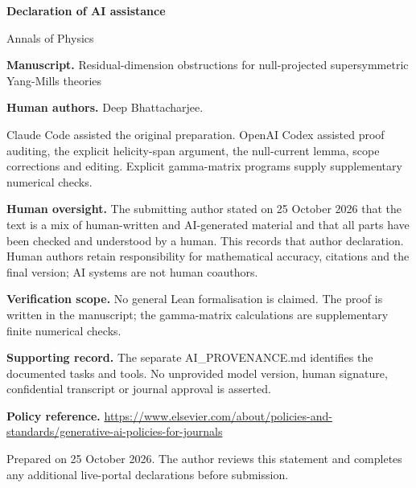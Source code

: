 \documentclass[11pt]{article}
\begin{document}
{\Large\bfseries\color{ink} Declaration of AI assistance}\par
Annals of Physics\par{}\par\medskip
\textbf{Manuscript.} Residual-dimension obstructions for null-projected supersymmetric Yang-Mills theories\par

\textbf{Human authors.} Deep Bhattacharjee.\par

Claude Code assisted the original preparation. OpenAI Codex assisted proof auditing, the explicit helicity-span argument, the null-current lemma, scope corrections and editing. Explicit gamma-matrix programs supply supplementary numerical checks.\par

\textbf{Human oversight.} The submitting author stated on 25 October 2026 that the text is a mix of human-written and AI-generated material and that all parts have been checked and understood by a human. This records that author declaration. Human authors retain responsibility for mathematical accuracy, citations and the final version; AI systems are not human coauthors.\par

\textbf{Verification scope.} No general Lean formalisation is claimed. The proof is written in the manuscript; the gamma-matrix calculations are supplementary finite numerical checks.\par

\textbf{Supporting record.} The separate AI\_PROVENANCE.md identifies the documented tasks and tools. No unprovided model version, human signature, confidential transcript or journal approval is asserted.\par

\textbf{Policy reference.} \url{https://www.elsevier.com/about/policies-and-standards/generative-ai-policies-for-journals}\par

{\small Prepared on 25 October 2026. The author reviews this statement and completes any additional live-portal declarations before submission.}
\end{document}
